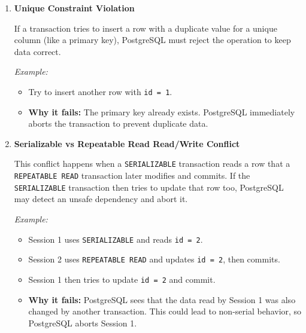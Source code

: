 \documentclass{article}
\begin{document}
\begin{enumerate}[label=\alph*)]
\begin{enumerate}
    \item \textbf{Unique Constraint Violation}

    If a transaction tries to insert a row with a duplicate value for a unique column (like a primary key), PostgreSQL must reject the operation to keep data correct.

    \textit{Example:}
    \begin{itemize}
        \item Try to insert another row with \texttt{id = 1}.
        \item \textbf{Why it fails:} The primary key already exists. PostgreSQL immediately aborts the transaction to prevent duplicate data.
    \end{itemize}

    \item \textbf{Serializable vs Repeatable Read Read/Write Conflict}

    This conflict happens when a \texttt{SERIALIZABLE} transaction reads a row that a \texttt{REPEATABLE READ} transaction later modifies and commits. If the \texttt{SERIALIZABLE} transaction then tries to update that row too, PostgreSQL may detect an unsafe dependency and abort it.

    \textit{Example:}
    \begin{itemize}
        \item Session 1 uses \texttt{SERIALIZABLE} and reads \texttt{id = 2}.
        \item Session 2 uses \texttt{REPEATABLE READ} and updates \texttt{id = 2}, then commits.
        \item Session 1 then tries to update \texttt{id = 2} and commit.
        \item \textbf{Why it fails:} PostgreSQL sees that the data read by Session 1 was also changed by another transaction. This could lead to non-serial behavior, so PostgreSQL aborts Session 1.
    \end{itemize}


        \end{enumerate}
    
    \end{enumerate}
\end{document}
